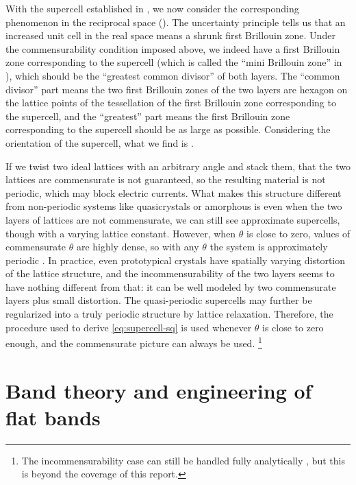 \documentclass[hyperref, a4paper]{article}
\begin{document}
With the supercell established in ,
we now consider the corresponding phenomenon in the reciprocal space
().
The uncertainty principle tells us that an increased unit cell in the real space 
means a shrunk first Brillouin zone.
Under the commensurability condition imposed above,
we indeed have a first Brillouin zone corresponding to the supercell
(which is called the ``mini Brillouin zone'' in \cite{cao_correlated_2018,cao_unconventional_2018}),
which should be the ``greatest common divisor'' of both layers.
The ``common divisor'' part means the two first Brillouin zones of the two layers 
are hexagon on the lattice points of the tessellation 
of the first Brillouin zone corresponding to the supercell,
and the ``greatest'' part means the first Brillouin zone corresponding to the supercell
should be as large as possible.
Considering the orientation of the supercell,
what we find is .

If we twist two ideal lattices with an arbitrary angle and stack them,
that the two lattices are commensurate is not guaranteed,
so the resulting material is not periodic,
which may block electric currents.
What makes this structure different from non-periodic systems like quasicrystals or amorphous is 
even when the two layers of lattices are not commensurate,
we can still see approximate supercells,
though with a varying lattice constant.
However, when $\theta$ is close to zero,
values of commensurate $\theta$ are highly dense,
so with any $\theta$ the system is approximately periodic \cite{yao_quasicrystalline_2018}.
In practice, even prototypical crystals have spatially varying distortion of the lattice structure,
and the incommensurability of the two layers seems to have nothing different from that:
it can be well modeled by two commensurate layers plus small distortion.
The quasi-periodic supercells may further be regularized into a truly periodic structure by lattice relaxation.
Therefore, the procedure used to derive \eqref{eq:supercell-sq} is used
whenever $\theta$ is close to zero enough,
and the commensurate picture can always be used.%
\footnote{
    The incommensurability case can still be handled fully analytically \cite{catarina_twisted_2019},  
    but this is beyond the coverage of this report.
}

\section{Band theory and engineering of flat bands}
\end{document}
